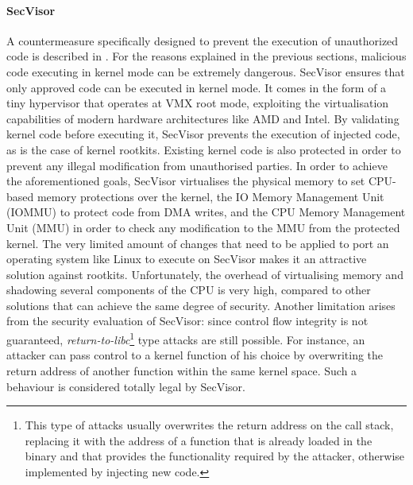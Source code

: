 \paragraph{SecVisor}
A countermeasure specifically designed to prevent the execution of unauthorized code is described in \cite{SecVisor}. For the reasons explained in the previous sections, malicious code executing in kernel mode can be extremely dangerous. SecVisor ensures that only approved code can be executed in kernel mode. It comes in the form of a tiny hypervisor that operates at VMX root mode, exploiting the virtualisation capabilities of modern hardware architectures like AMD and Intel. By validating kernel code before executing it, SecVisor prevents the execution of injected code, as is the case of kernel rootkits. 
Existing kernel code is also protected in order to prevent any illegal modification from unauthorised parties. In order to achieve the aforementioned goals, SecVisor virtualises the physical memory to set CPU-based memory protections over the kernel, the IO Memory Management Unit (IOMMU) to protect code from DMA writes, and the CPU Memory Management Unit (MMU) in order to check any modification to the MMU from the protected kernel. 
The very limited amount of changes that need to be applied to port an operating system like Linux to execute on SecVisor makes it an attractive solution against rootkits. Unfortunately, the overhead of virtualising memory and shadowing several components of the CPU is very high, compared to other solutions that can achieve the same degree of security.
Another limitation arises from the security evaluation of SecVisor: since control flow integrity is not guaranteed, \emph{return-to-libc}\footnote{This type of attacks usually overwrites the return address on the call stack, replacing it with the address of a function that is already loaded in the binary and that provides the functionality required by the attacker, otherwise implemented by injecting new code.}  type attacks are still possible. For instance, an attacker can pass control to a kernel function of his choice by overwriting the return address of another function within the same kernel space. Such a  behaviour is considered totally legal by SecVisor.

